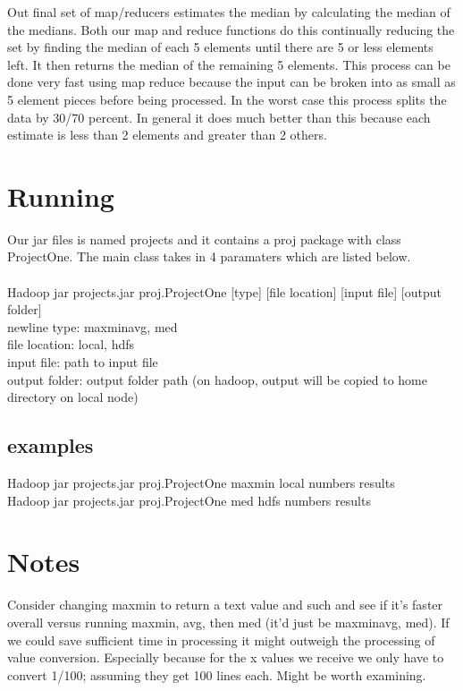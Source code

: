 \documentclass[11pt]{article}
\begin{document}
Out final set of map/reducers estimates the median by calculating the median of the medians.  Both our map and reduce functions do this continually reducing the set by finding the median of each 5 elements until there are 5 or less elements left.  It then returns the median of the remaining 5 elements.  This process can be done very fast using map reduce because the input can be broken into as small as 5 element pieces before being processed.  In the worst case this process splits the data by 30/70 percent.  In general it does much better than this because each estimate is less than 2 elements and greater than 2 others.  

\section{Running}
Our jar files is named projects and it contains a proj package with class ProjectOne.  The main class takes in 4 paramaters which are listed below.\\\\
Hadoop jar projects.jar proj.ProjectOne [type] [file location] [input file] [output folder]\\
newline type: maxminavg, med\\
 file location: local, hdfs\\
 input file: path to input file\\
 output folder: output folder path (on hadoop, output will be copied to home directory on local node)\\

\subsection*{examples}
Hadoop jar projects.jar proj.ProjectOne maxmin local numbers results\\
 Hadoop jar projects.jar proj.ProjectOne med hdfs numbers results


\section*{Notes}
Consider changing maxmin to return a text value and such and see if it's faster overall versus running maxmin, avg, then med (it'd just be maxminavg, med).  If we could save sufficient time in processing it might outweigh the processing of value conversion.  Especially because for the x values we receive we only have to convert 1/100; assuming they get 100 lines each.  Might be worth examining.
\end{document}
